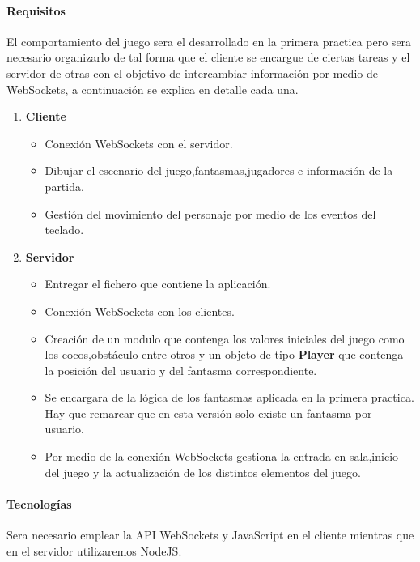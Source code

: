 \paragraph{Requisitos}
El comportamiento del juego sera el desarrollado en la primera practica pero sera necesario organizarlo de tal forma que el cliente se encargue de ciertas tareas y el servidor de otras con el objetivo de intercambiar información por medio de WebSockets, a continuación se explica en detalle cada una.
\begin{enumerate}
\item\textbf{Cliente}
\begin{itemize}
\item  Conexión WebSockets con el servidor.
\item  Dibujar el escenario del juego,fantasmas,jugadores e información de la partida.
\item  Gestión del movimiento del personaje por medio de los eventos del teclado.
\end{itemize}
\item\textbf{Servidor}
\begin{itemize}
\item Entregar el fichero que contiene la aplicación.
\item Conexión WebSockets con los clientes.
\item Creación de un modulo que contenga los valores iniciales del juego como los cocos,obstáculo entre otros y un objeto de tipo \textbf{Player} que contenga la posición del usuario y del fantasma correspondiente.
\item Se encargara de la lógica de los fantasmas aplicada en la primera practica. Hay que remarcar que en esta versión solo existe un fantasma por usuario.
\item Por medio de la conexión WebSockets gestiona la entrada en sala,inicio del juego y la actualización de los distintos elementos del juego.
\end{itemize}
\end{enumerate}
\paragraph{Tecnologías}
Sera necesario emplear la API WebSockets y JavaScript en el cliente mientras que en el servidor utilizaremos NodeJS.
